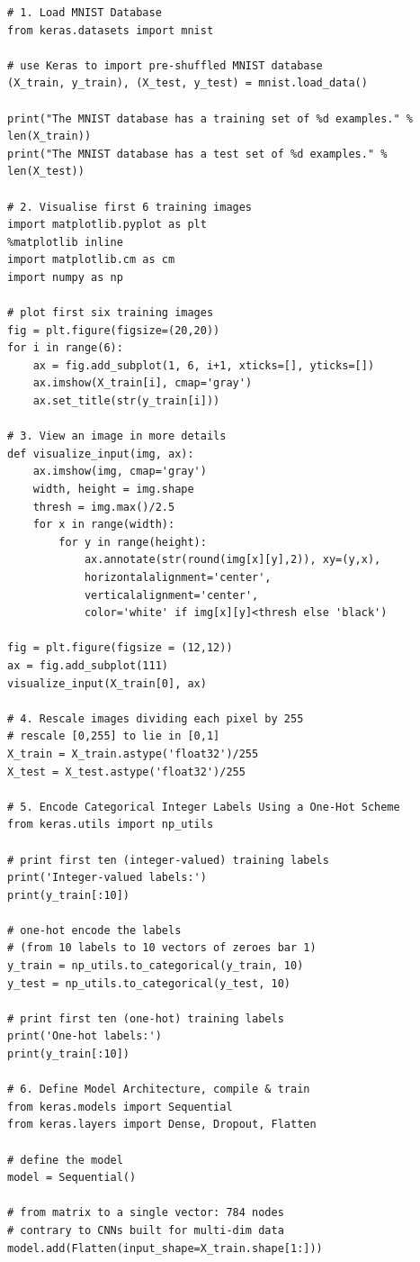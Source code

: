 \documentclass[11pt]{article}
\begin{document}
\begin{lstlisting}
# 1. Load MNIST Database
from keras.datasets import mnist

# use Keras to import pre-shuffled MNIST database
(X_train, y_train), (X_test, y_test) = mnist.load_data()

print("The MNIST database has a training set of %d examples." % len(X_train))
print("The MNIST database has a test set of %d examples." % len(X_test))

# 2. Visualise first 6 training images
import matplotlib.pyplot as plt
%matplotlib inline
import matplotlib.cm as cm
import numpy as np

# plot first six training images
fig = plt.figure(figsize=(20,20))
for i in range(6):
	ax = fig.add_subplot(1, 6, i+1, xticks=[], yticks=[])
	ax.imshow(X_train[i], cmap='gray')
	ax.set_title(str(y_train[i]))

# 3. View an image in more details
def visualize_input(img, ax):
	ax.imshow(img, cmap='gray')
	width, height = img.shape
	thresh = img.max()/2.5
	for x in range(width):
		for y in range(height):
			ax.annotate(str(round(img[x][y],2)), xy=(y,x),
			horizontalalignment='center',
			verticalalignment='center',
			color='white' if img[x][y]<thresh else 'black')

fig = plt.figure(figsize = (12,12)) 
ax = fig.add_subplot(111)
visualize_input(X_train[0], ax)

# 4. Rescale images dividing each pixel by 255
# rescale [0,255] to lie in [0,1]
X_train = X_train.astype('float32')/255
X_test = X_test.astype('float32')/255 

# 5. Encode Categorical Integer Labels Using a One-Hot Scheme
from keras.utils import np_utils

# print first ten (integer-valued) training labels
print('Integer-valued labels:')
print(y_train[:10])

# one-hot encode the labels 
# (from 10 labels to 10 vectors of zeroes bar 1)
y_train = np_utils.to_categorical(y_train, 10)
y_test = np_utils.to_categorical(y_test, 10)

# print first ten (one-hot) training labels
print('One-hot labels:')
print(y_train[:10])

# 6. Define Model Architecture, compile & train
from keras.models import Sequential
from keras.layers import Dense, Dropout, Flatten

# define the model
model = Sequential()

# from matrix to a single vector: 784 nodes
# contrary to CNNs built for multi-dim data
model.add(Flatten(input_shape=X_train.shape[1:]))


\end{lstlisting}
\end{document}

